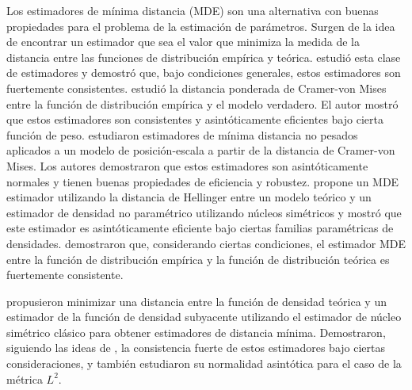 Los estimadores de mínima distancia (MDE) son una  alternativa con buenas propiedades para el problema de la estimación de parámetros.
Surgen de la idea de encontrar un estimador que sea el valor que minimiza la medida de la distancia entre las funciones de distribución empírica y teórica.
\citet{wolfowitz1953, wolfowitz1957} estudió esta clase de estimadores y demostró que, bajo condiciones generales, estos estimadores son fuertemente consistentes. 
\citet{Boos1981} estudió la distancia ponderada de Cramer-von Mises entre la función de distribución empírica y el modelo verdadero.
El autor mostró que estos estimadores son consistentes y asintóticamente eficientes bajo cierta función de peso. \citet{HettmanSperger1994} estudiaron estimadores de mínima distancia no pesados aplicados a un modelo de posición-escala a partir de la distancia de Cramer-von Mises. Los autores demostraron que estos estimadores son asintóticamente normales y tienen buenas propiedades de eficiencia y robustez. \citet{beran1977} propone un MDE estimador utilizando la distancia de Hellinger entre un modelo teórico y un estimador de densidad no paramétrico utilizando núcleos simétricos y mostró que este estimador es asintóticamente eficiente bajo ciertas familias paramétricas de densidades. \citet{parr1982} demostraron que, considerando ciertas condiciones, el estimador MDE entre la función de distribución empírica y la función de distribución teórica es fuertemente consistente.

\citet{cao1995minimum} propusieron minimizar una distancia entre la función de densidad teórica y un estimador de la función de densidad subyacente utilizando el estimador de núcleo simétrico clásico para obtener estimadores de distancia mínima. Demostraron, siguiendo las ideas de \citet{parr1982}, la consistencia fuerte de estos estimadores bajo ciertas consideraciones, y también estudiaron su normalidad asintótica para el caso de la métrica $ L^2 $.


